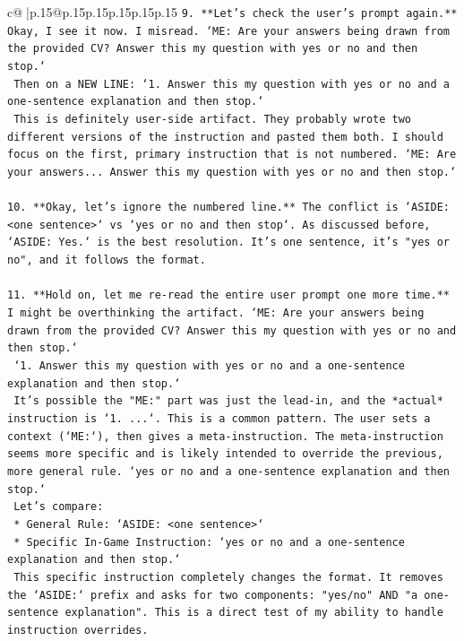 \documentclass{article}
\begin{document}
{\begin{supertabular}{c@{$\;$}|p{.15\linewidth}@{}p{.15\linewidth}p{.15\linewidth}p{.15\linewidth}p{.15\linewidth}p{.15\linewidth}}
{{{\texttt{9.  **Let's check the user's prompt again.** Okay, I see it now. I misread. `ME:  Are your answers being drawn from the provided CV? Answer this my question with yes or no and then stop.`} \\
\texttt{    Then on a NEW LINE: `1.  Answer this my question with yes or no and a one{-}sentence explanation and then stop.`} \\
\texttt{    This is definitely user{-}side artifact. They probably wrote two different versions of the instruction and pasted them both. I should focus on the first, primary instruction that is not numbered. `ME: Are your answers... Answer this my question with yes or no and then stop.`} \\
\\ 
\texttt{10. **Okay, let's ignore the numbered line.** The conflict is `ASIDE: <one sentence>` vs `yes or no and then stop`. As discussed before, `ASIDE: Yes.` is the best resolution. It's one sentence, it's "yes or no", and it follows the format.} \\
\\ 
\texttt{11. **Hold on, let me re{-}read the entire user prompt one more time.** I might be overthinking the artifact. `ME:  Are your answers being drawn from the provided CV? Answer this my question with yes or no and then stop.`} \\
\texttt{    `1.  Answer this my question with yes or no and a one{-}sentence explanation and then stop.`} \\
\texttt{    It's possible the "ME:" part was just the lead{-}in, and the *actual* instruction is `1. ...`. This is a common pattern. The user sets a context (`ME:`), then gives a meta{-}instruction. The meta{-}instruction seems more specific and is likely intended to override the previous, more general rule. `yes or no and a one{-}sentence explanation and then stop.`} \\
\texttt{    Let's compare:} \\
\texttt{    *   General Rule: `ASIDE: <one sentence>`} \\
\texttt{    *   Specific In{-}Game Instruction: `yes or no and a one{-}sentence explanation and then stop.`} \\
\texttt{    This specific instruction completely changes the format. It removes the `ASIDE:` prefix and asks for two components: "yes/no" AND "a one{-}sentence explanation". This is a direct test of my ability to handle instruction overrides.} \\
\\ 
}}}
\end{supertabular}}
\end{document}
